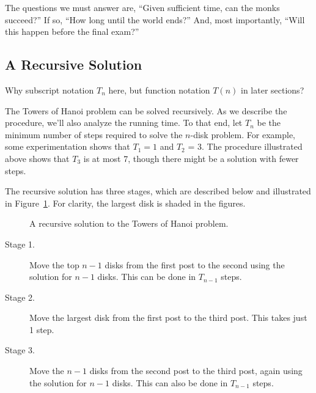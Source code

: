 The questions we must answer are, ``Given sufficient time, can the
monks succeed?''  If so, ``How long until the world ends?''  And, most
importantly, ``Will this happen before the final exam?''

\subsection{A Recursive Solution}

\begin{editingnotes}
Why subscript notation $T_n$ here, but function notation $T(n)$ in
later sections?
\end{editingnotes}

The Towers of Hanoi problem can be solved recursively.  As we describe
the procedure, we'll also analyze the running time.  To that end, let
$T_n$ be the minimum number of steps required to solve the $n$-disk
problem.  For example, some experimentation shows that $T_1 = 1$ and
$T_2$ = 3.  The procedure illustrated above shows that $T_3$ is at
most 7, though there might be a solution with fewer steps.

The recursive solution has three stages, which are described below and
illustrated in Figure~\ref{fig:10A3}.
For clarity, the largest disk is shaded in the figures.

\begin{figure}


\caption{A recursive solution to the Towers of Hanoi problem.}

\label{fig:10A3}

\end{figure}
\begin{description}

\item[Stage 1.]  Move the top $n-1$ disks from the first post to
  the second using the solution for $n - 1$ disks.  This can be done
  in $T_{n-1}$ steps.

\item[Stage 2.]  Move the largest disk from the first post to the
  third post.  This takes just 1 step.

\item[Stage 3.]  Move the $n-1$ disks from the second post to
  the third post, again using the solution for $n - 1$ disks.  This
  can also be done in $T_{n-1}$ steps.

\end{description}

